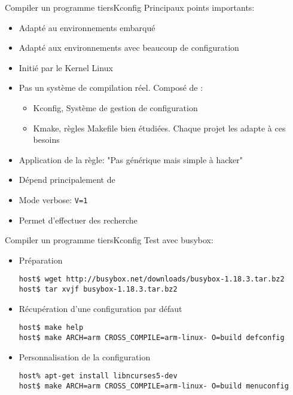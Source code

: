 \begin{frame}[fragile=singleslide]{Compiler un programme tiers}{Kconfig}
  Principaux points importants:
  \begin{itemize}
  \item Adapté au environnements embarqué
  \item Adapté aux environnements avec beaucoup de configuration
  \item Initié par le Kernel Linux
  \item  Pas un  système de  compilation réel. Composé de :
    \begin{itemize}
    \item Kconfig, Système de gestion de configuration
    \item  Kmake, règles  Makefile  bien étudiées.  Chaque projet  les
      adapte à ces besoins
    \end{itemize}
  \item Application de la règle: "Pas générique mais simple à hacker"
  \item Dépend principalement de 
  \item Mode verbose: \verb+V=1+
  \item Permet d'effectuer des recherche
  \end{itemize}
\end{frame}

\begin{frame}[fragile=singleslide]{Compiler un programme tiers}{Kconfig}
  Test avec busybox:
  \begin{itemize}
  \item Préparation
\begin{lstlisting}
host$ wget http://busybox.net/downloads/busybox-1.18.3.tar.bz2
host$ tar xvjf busybox-1.18.3.tar.bz2
\end{lstlisting} %
  \item Récupération d'une configuration par défaut
\begin{lstlisting}
host$ make help
host$ make ARCH=arm CROSS_COMPILE=arm-linux- O=build defconfig
\end{lstlisting} %
  \item Personnalisation de la configuration
\begin{lstlisting}
host% apt-get install libncurses5-dev
host$ make ARCH=arm CROSS_COMPILE=arm-linux- O=build menuconfig
\end{lstlisting} %
  \end{itemize}
\end{frame}

